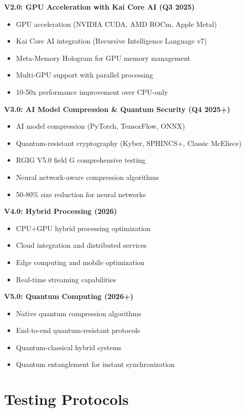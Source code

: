\documentclass[11pt]{article}
\begin{document}
\textbf{V2.0: GPU Acceleration with Kai Core AI (Q3 2025)}
\begin{itemize}
  \item GPU acceleration (NVIDIA CUDA, AMD ROCm, Apple Metal)
  \item Kai Core AI integration (Recursive Intelligence Language v7)
  \item Meta-Memory Hologram for GPU memory management
  \item Multi-GPU support with parallel processing
  \item 10-50x performance improvement over CPU-only
\end{itemize}

\textbf{V3.0: AI Model Compression \& Quantum Security (Q4 2025+)}
\begin{itemize}
  \item AI model compression (PyTorch, TensorFlow, ONNX)
  \item Quantum-resistant cryptography (Kyber, SPHINCS+, Classic McEliece)
  \item RGIG V5.0 field G comprehensive testing
  \item Neural network-aware compression algorithms
  \item 50-80\% size reduction for neural networks
\end{itemize}

\textbf{V4.0: Hybrid Processing (2026)}
\begin{itemize}
  \item CPU+GPU hybrid processing optimization
  \item Cloud integration and distributed services
  \item Edge computing and mobile optimization
  \item Real-time streaming capabilities
\end{itemize}

\textbf{V5.0: Quantum Computing (2026+)}
\begin{itemize}
  \item Native quantum compression algorithms
  \item End-to-end quantum-resistant protocols
  \item Quantum-classical hybrid systems
  \item Quantum entanglement for instant synchronization
\end{itemize}

\section*{Testing Protocols}
\end{document}
